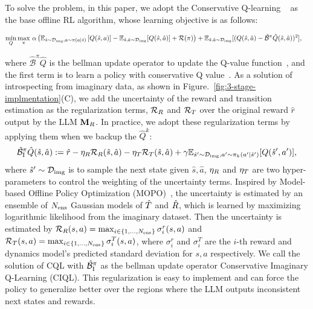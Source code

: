 To solve the problem, in this paper, we adopt the Conservative Q-learning ~\citep{cql@2020aviral} as the base offline RL algorithm, whose learning objective is as follows:
\begin{small}
$$\begin{aligned}
\min _Q \max_\pi~&\alpha\left(\mathbb{E}_{\hat s \sim \mathcal{D}_{\rm img}, a \sim \pi(a \mid \hat s)}\left[Q(\hat s, a)\right]-\mathbb{E}_{\hat s, \hat a \sim \mathcal{D}_{\rm img}}[Q(\hat s, \hat a)]+\mathcal{R}(\pi)\right)  +\mathbb{E}_{\hat s, \hat a \sim \mathcal{D}_{\rm img}}[(Q(\hat s, \hat a)-\hat{\mathcal{B}}^{\pi} \hat{Q}(\hat s, \hat a))^2],
\end{aligned}$$
\end{small}
where $\hat{\mathcal{B}}^{\pi} \hat{Q}$ is the bellman update operator to update the Q-value function~\citep{rl@2018sutton}, and the first term is to learn a policy with conservative Q value~\citep{cql@2020aviral}. As a solution of introspecting from imaginary data, as shown in Figure.~\ref{fig:3-stage-implmentation}(C), we add the uncertainty of the reward and transition estimation as the regularization terms, $\mathcal{R}_{R}$ and $\mathcal{R}_{T}$ over the original reward $\hat r$ output by the LLM $\mathbf{M}_{R}$. In practice, we adopt these regularization terms by applying them when we backup the $\hat Q^k$:
\begin{align*}
    \hat{\mathcal{B}}^{\pi}_{\rm I} \hat{Q}(\hat s, \hat a) := \hat r - \eta_{R} \mathcal{R}_{R}(\hat s, \hat a) - \eta_{T} \mathcal{R}_{T}(\hat s, \hat a) + \gamma \mathbb{E}_{\hat s' \sim \mathcal{D}_{\rm img}, a' \sim \pi_k(a' |\hat s')}[Q(\hat s', a') ],
\end{align*}
where $\hat s' \sim \mathcal{D}_{\rm img}$ is to sample the next state given $\hat s, \hat a$, $\eta_R$ and $\eta_T$ are two hyper-parameters to control the weighting of the uncertainty terms. Inspired by Model-based Offline Policy Optimization (MOPO)~\citep{mopo@2020tianhe}, the uncertainty is estimated by an ensemble of $N_{\rm ens}$ Gaussian models of $\hat {T}$ and $\hat {R}$, which is learned by maximizing logarithmic likelihood from the imaginary dataset. Then the uncertainty is estimated by $\mathcal{R}_{R}(s, a) = \max_{i\in\{1, \dots, N_{\rm ens}\}} \sigma^r_i(s, a)$ and $\mathcal{R}_{T}(s, a)=\max_{i\in\{1, \dots, N_{\rm ens}\}} \sigma^T_i(s, a)$, where $\sigma^r_i$ and $\sigma^T_i$ are the $i$-th reward and dynamics model's predicted standard deviation for $s, a$ respectively. We call the solution of CQL with $\hat{\mathcal{B}}^{\pi}_{\rm I}$ as the bellman update operator Conservative Imaginary Q-Learning (CIQL). 
This regularization is easy to implement and can force the policy to generalize better over the regions where the LLM outputs inconsistent next states and rewards.